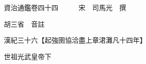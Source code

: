 










 


 
 


 

  
  
  
  
  





  
  
  
  
  
 
  

  

  
  
  



  

 
 

  
   




  

  
  


  　　資治通鑑卷四十四　　　宋　司馬光　撰

　　胡三省　音註

　　漢紀三十六【起強圉協洽盡上章涒灘凡十四年】

　　世祖光武皇帝下

